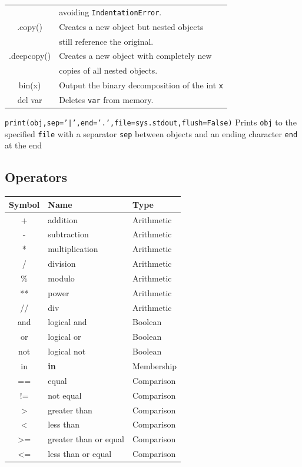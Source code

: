 \documentclass[5pt]{article}
\begin{document}
\begin{multicols}{2}
\begin{tabular}{C L}
                            & avoiding \texttt{IndentationError}.\\
        .copy()             & Creates a new object but nested objects\\
                            & still reference the original.\\
        .deepcopy()         & Creates a new object with completely new\\
                            & copies of all nested objects.\\
        bin(x)              & Output the binary decomposition of the int \texttt{x}\\
        del var             & Deletes \texttt{var} from memory.\\
    \end{tabular}
\texttt{print(obj,sep='|',end='.',file=sys.stdout,flush=False)}
Prints \texttt{obj} to the specified \texttt{file} with a separator \texttt{sep} between objects and an ending character \texttt{end} at the end

\subsection{Operators}
\begin{tabular}{|C|L|L|}
    \hline
    Symbol  &   Name                    & Type       \\
    \hline
    +       & addition                  & Arithmetic \\
    -       & subtraction               & Arithmetic \\
    *       & multiplication            & Arithmetic \\
    /       & division                  & Arithmetic \\
    \%      & modulo                    & Arithmetic \\
    **      & power                     & Arithmetic \\
    //      & div                       & Arithmetic \\
    and     & logical and               & Boolean    \\
    or      & logical or                & Boolean    \\
    not     & logical not               & Boolean    \\
    in      & \textbf{in}               & Membership \\
    ==      & equal                     & Comparison \\
    !=      & not equal                 & Comparison \\
    >       & greater than              & Comparison \\
    <       & less than                 & Comparison \\
    >=      & greater than or equal     & Comparison \\
    <=      & less than or equal        & Comparison \\
    \hline
\end{tabular}



\end{multicols}
\end{document}
